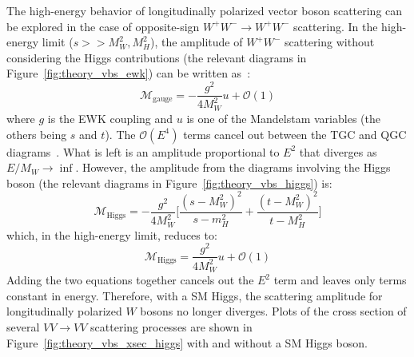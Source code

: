 The high-energy behavior of longitudinally polarized vector boson scattering can be explored in the case of opposite-sign $W^{+}W^{-}\rightarrow W^{+}W^{-}$ scattering.
In the high-energy limit ($s >> M_W^2, M_H^2$), the amplitude of $W^{+}W^{-}$ scattering without considering the Higgs contributions (the relevant diagrams in Figure~\ref{fig:theory_vbs_ewk}) can be written as~\cite{2009.strong-gauge-boson-scattering}:
\begin{equation}
  \mathcal{M}_{\textrm{gauge}} = -\frac{g^2}{4M_W^2}u+\mathcal{O}(1) %
  \label{eq:theory_longitudinal_m_gauge}
\end{equation}
where $g$ is the EWK coupling and $u$ is one of the Mandelstam variables (the others being $s$ and $t$).
The $\mathcal{O}(E^4)$ terms cancel out between the TGC and QGC diagrams~\cite{2012.vbs-thesis-oord}.
What is left is an amplitude proportional to $E^2$ that diverges as $E/M_W\rightarrow\inf$. 
However, the amplitude from the diagrams involving the Higgs boson (the relevant diagrams in Figure~\ref{fig:theory_vbs_higgs}) is:
\begin{equation}
  \mathcal{M}_{\textrm{Higgs}} = -\frac{g^2}{4M_W^2}\bigg[\frac{(s-M_W^2)^2}{s-m_H^2}+\frac{(t-M_W^2)^2}{t-M_H^2}\bigg]
\end{equation}
which, in the high-energy limit, reduces to:
\begin{equation}
  \mathcal{M}_{\textrm{Higgs}} = \frac{g^2}{4M_W^2}u+\mathcal{O}(1)
  \label{eq:theory_longitudinal_m_higgs}
\end{equation}
Adding the two equations together cancels out the $E^2$ term and leaves only terms constant in energy.
Therefore, with a SM Higgs, the scattering amplitude for longitudinally polarized $W$ bosons no longer diverges.
Plots of the cross section of several $VV\rightarrow VV$ scattering processes are shown in Figure~\ref{fig:theory_vbs_xsec_higgs} with and without a SM Higgs boson.

